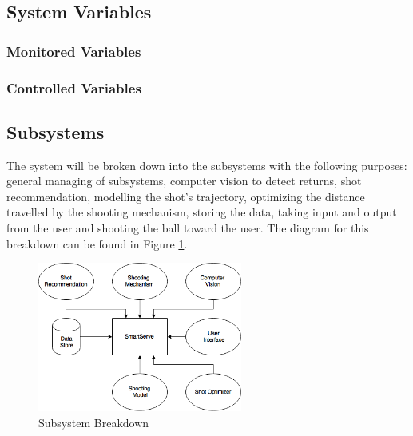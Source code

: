 \documentclass[11pt]{article}
\begin{document}
\subsection{System Variables}
\subsubsection{Monitored Variables}
\subsubsection{Controlled Variables}

\subsection{Subsystems}
The system will be broken down into the subsystems with the following purposes: general managing of subsystems, computer vision to detect returns, shot recommendation, modelling the shot's trajectory, optimizing the distance travelled by the shooting mechanism, storing the data, taking input and output from the user and shooting the ball toward the user. The diagram for this breakdown can be found in Figure \ref{fig:sub}.
\begin{figure}[H]
   \centering
   \includegraphics[width=0.6\textwidth]{img/Subsystem.png} %
   \caption{Subsystem Breakdown}
   \label{fig:sub}
\end{figure}
\end{document}
